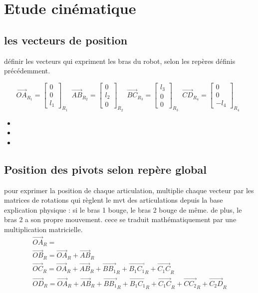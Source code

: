 \documentclass[12pt,a4paper]{article}
\begin{document}
\section{Etude cinématique}


\subsection{les vecteurs de position}

définir les vecteurs qui expriment les bras du robot, selon les repères définis précédemment. 

\begin{equation}
\vec{OA}_{R_{1}}=
\begin{bmatrix}
0 \\
0\\
l_1
\end{bmatrix}_{R_{1}} \enspace
\vec{AB}_{R_{2}}=
\begin{bmatrix}
0 \\
l_2\\
0
\end{bmatrix}_{R_{2}} \enspace
\vec{BC}_{R_{3}}=
\begin{bmatrix}
l_3 \\
0\\
0
\end{bmatrix}_{R_{3}} \enspace
\vec{CD}_{R_{4}}=
\begin{bmatrix}
0 \\
0\\
-l_4
\end{bmatrix}_{R_{4}} \enspace
\end{equation}

\begin{itemize}
	\item
	\item 
	\item 
\end{itemize}


\medbreak

\medbreak

\medbreak

\medbreak


\subsection{Position des pivots selon repère global}
pour exprimer la position de chaque articulation, multiplie chaque vecteur par les matrices de rotations qui règlent le mvt des articulations depuis la base
\medbreak
explication physique : si le bras 1 bouge, le bras 2 bouge de même. de plus, le bras 2 a son propre mouvement. cece se traduit mathématiquement par une multiplication matricielle.  
\begin{eqnarray}
\vec{OA}_R=\\
\vec{OB}_R=\vec{OA}_R+\vec{AB}_R\\
\vec{OC}_R=\vec{OA}_R+\vec{AB}_R+\vec{B B_1}_R+\vec{B_1 C_1}_R+\vec{C_1 C}_R\\
\vec{OD}_R=\vec{OA}_R+\vec{AB}_R+\vec{B B_1}_R+\vec{B_1 C_1}_R+\vec{C_1 C}_R+\vec{C C_2}_R+\vec{C_2 D}_R
\end{eqnarray}
\end{document}
